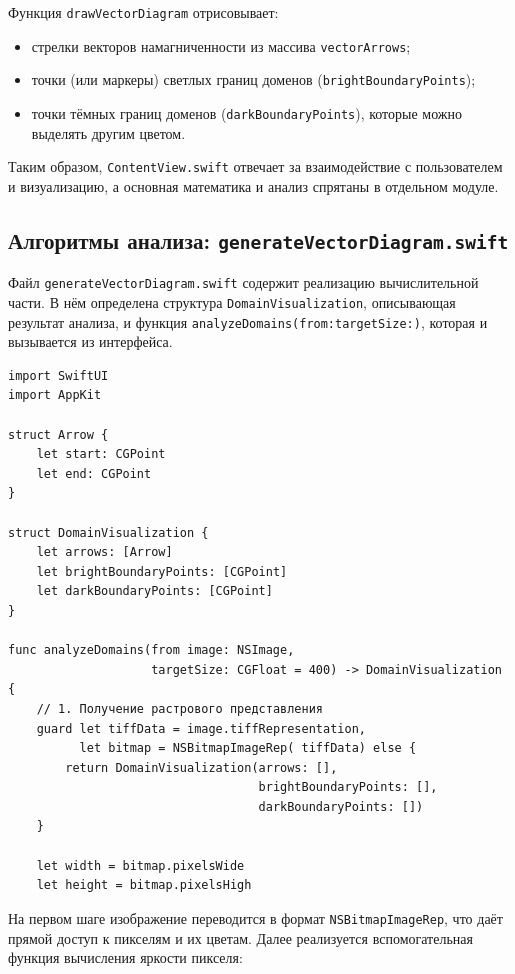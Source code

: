 \documentclass[12pt,a4paper]{article}
\numberwithin{equation}{section}
\begin{document}
Функция \texttt{drawVectorDiagram} отрисовывает:

\begin{itemize}
    \item стрелки векторов намагниченности из массива \texttt{vectorArrows};
    \item точки (или маркеры) светлых границ доменов (\texttt{brightBoundaryPoints});
    \item точки тёмных границ доменов (\texttt{darkBoundaryPoints}), которые можно выделять другим цветом.
\end{itemize}

Таким образом, \texttt{ContentView.swift} отвечает за взаимодействие с пользователем и визуализацию, а основная математика и анализ спрятаны в отдельном модуле.

\subsection{Алгоритмы анализа: \texttt{generateVectorDiagram.swift}}

Файл \texttt{generateVectorDiagram.swift} содержит реализацию вычислительной части. В нём определена структура \texttt{DomainVisualization}, описывающая результат анализа, и функция \texttt{analyzeDomains(from:targetSize:)}, которая и вызывается из интерфейса.

\begin{verbatim}
import SwiftUI
import AppKit

struct Arrow {
    let start: CGPoint
    let end: CGPoint
}

struct DomainVisualization {
    let arrows: [Arrow]
    let brightBoundaryPoints: [CGPoint]
    let darkBoundaryPoints: [CGPoint]
}

func analyzeDomains(from image: NSImage,
                    targetSize: CGFloat = 400) -> DomainVisualization {
    // 1. Получение растрового представления
    guard let tiffData = image.tiffRepresentation,
          let bitmap = NSBitmapImageRep( tiffData) else {
        return DomainVisualization(arrows: [],
                                   brightBoundaryPoints: [],
                                   darkBoundaryPoints: [])
    }

    let width = bitmap.pixelsWide
    let height = bitmap.pixelsHigh
\end{verbatim}

На первом шаге изображение переводится в формат \texttt{NSBitmapImageRep}, что даёт прямой доступ к пикселям и их цветам. Далее реализуется вспомогательная функция вычисления яркости пикселя:
\end{document}
